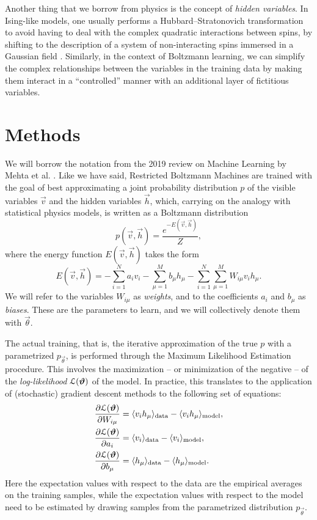 \documentclass[prl, twocolumn]{revtex4-2}
\begin{document}
Another thing that we borrow from physics is the concept of \emph{hidden
variables}. In Ising-like models, one usually performs a
Hubbard–Stratonovich transformation to avoid having to deal with the
complex quadratic interactions between spins, by shifting to the
description of a system of non-interacting spins immersed in a Gaussian
field \cite{Hubbard1959}. Similarly, in the context of Boltzmann learning,
we can simplify the complex relationships between the variables in the
training data by making them interact in a “controlled” manner with an
additional layer of fictitious variables. 

\section{Methods}
We will borrow the notation from the 2019 review on Machine Learning by
Mehta et al. \cite{Mehta2019}. Like we have said, Restricted Boltzmann
Machines are trained with the goal of best approximating a joint
probability distribution $p$ of the visible variables $\vec{v}$ and the
hidden variables $\vec{h}$, which, carrying on the analogy with statistical
physics models, is written as a Boltzmann distribution
\begin{equation}
    p(\vec{v}, \vec{h}) = \frac{e^{-E(\vec{v}, \vec{h})}}{Z},
\end{equation}
where the energy function $E(\vec{v}, \vec{h})$ takes the form
\begin{equation}
    E(\vec{v}, \vec{h}) = - \sum_{i = 1}^{N} a_i v_i - \sum_{\mu = 1}^{M}
    b_\mu h_\mu - \sum_{i = 1}^{N} \sum_{\mu = 1}^{M} W_{i \mu} v_i h_\mu.
\end{equation}
We will refer to the variables $W_{i\mu}$ as \emph{weights}, and to the
coefficients $a_i$ and $b_\mu$ as \emph{biases}. These are the parameters
to learn, and we will collectively denote them with $\vec{\theta}$.

The actual training, that is, the iterative approximation of the true $p$
with a parametrized $p_{\vec{\theta}}$, is performed through the Maximum
Likelihood Estimation procedure. This involves the maximization – or
minimization of the negative – of the \emph{log-likelihood}
$\mathcal{L}(\bm{\vartheta})$ of the model. In practice, this translates to the
application of (stochastic) gradient descent methods to the following set
of equations:
\begin{align}
    \pdiff{\logL(\vec{\theta})}{W_{i\mu}} &= \expval{v_i
    h_\mu}_{\mathrm{data}} - \expval{v_i h_\mu}_{\mathrm{model}},
    \label{eq:dL_dW} \\
    \pdiff{\logL(\vec{\theta})}{a_i} &= \expval{v_i}_{\mathrm{data}} -
    \expval{v_i}_{\mathrm{model}}, \label{eq:dL_da} \\
    \pdiff{\logL(\vec{\theta})}{b_\mu} &= \expval{h_\mu}_{\mathrm{data}} -
    \expval{h_\mu}_{\mathrm{model}}. \label{eq:dL_db}
\end{align}
Here the expectation values with respect to the data are the empirical
averages on the training samples, while the expectation values with respect
to the model need to be estimated by drawing samples from the parametrized
distribution $p_{\vec{\theta}}$.
\end{document}
